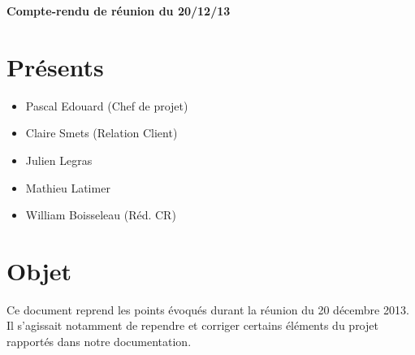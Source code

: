 \documentclass[a4paper,11pt,french]{article}
\author{\hmwkAuthorName}
\date{} %
\newcommand{\hmwkDocName}{Compte-rendu de réunion du 20/12/13} %
\begin{document}
\pagestyle{fancy}

\begin{center}\textbf{\Huge{\hmwkDocName}}\end{center}
	
\section{Présents}
\begin{itemize}
\item Pascal Edouard (Chef de projet)
\item Claire Smets (Relation Client)
\item Julien Legras
\item Mathieu Latimer
\item William Boisseleau (Réd. CR)
\end{itemize}

\section{Objet}
Ce document reprend les points évoqués durant la réunion du 20 décembre 2013. Il s'agissait notamment de rependre et corriger certains éléments du projet rapportés dans notre documentation. 
\end{document}
